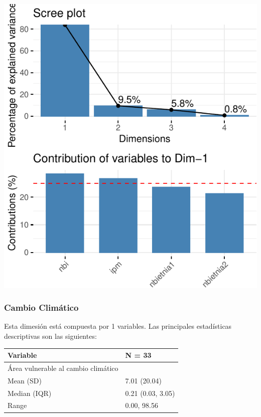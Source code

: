 \includegraphics{Anexo_PCA_files/figure-latex/unnamed-chunk-1-5.pdf}

\hypertarget{cambio-climuxe1tico}{%
\subsubsection{Cambio Climático}\label{cambio-climuxe1tico}}

Esta dimesión está compuesta por 1 variables. Las principales
estadísticas descriptivas son las siguientes:

\begin{table}
\centering\begingroup\fontsize{7}{9}\selectfont

\begin{tabular}{ll}
\toprule
Variable & N = 33\\
\midrule
Área vulnerable al cambio climático & \\
\hspace{1em}Mean (SD) & 7.01 (20.04)\\
\hspace{1em}Median (IQR) & 0.21 (0.03, 3.05)\\
\hspace{1em}Range & 0.00, 98.56\\
\bottomrule
\end{tabular}
\endgroup{}
\end{table}

